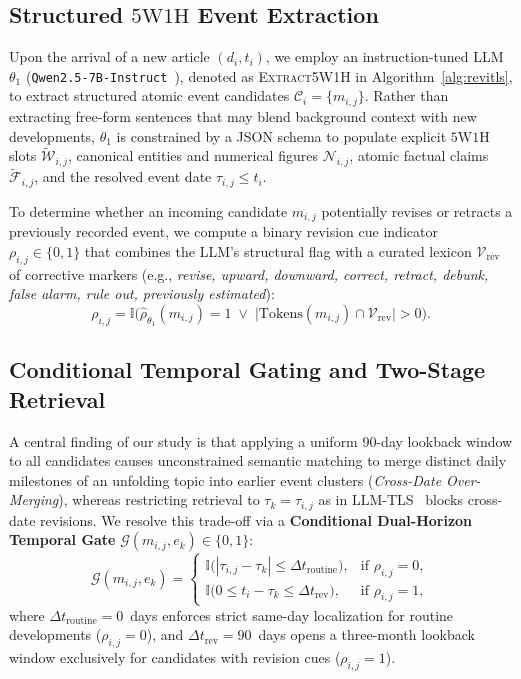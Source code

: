 \documentclass[journal]{IEEEtran}
\begin{document}
\subsection{Structured $5\text{W}1\text{H}$ Event Extraction}
\label{subsec:extraction}

Upon the arrival of a new article $(d_i, t_i)$, we employ an instruction-tuned LLM $\theta_1$ (\texttt{Qwen2.5-7B-Instruct}~\cite{qwen25}), denoted as \textsc{Extract5W1H} in Algorithm~\ref{alg:revitls}, to extract structured atomic event candidates $\mathcal{C}_i = \{m_{i,j}\}$. Rather than extracting free-form sentences that may blend background context with new developments, $\theta_1$ is constrained by a JSON schema to populate explicit $5\text{W}1\text{H}$ slots $\tilde{\mathcal{W}}_{i,j}$, canonical entities and numerical figures $\mathcal{N}_{i,j}$, atomic factual claims $\tilde{\mathcal{F}}_{i,j}$, and the resolved event date $\tau_{i,j} \le t_i$.

To determine whether an incoming candidate $m_{i,j}$ potentially revises or retracts a previously recorded event, we compute a binary revision cue indicator $\rho_{i,j} \in \{0, 1\}$ that combines the LLM's structural flag with a curated lexicon $\mathcal{V}_{\text{rev}}$ of corrective markers (e.g., \textit{revise, upward, downward, correct, retract, debunk, false alarm, rule out, previously estimated}):
\begin{equation}
\rho_{i,j} = \mathbb{I}\Big( \hat{\rho}_{\theta_1}(m_{i,j}) = 1 \;\lor\; \big|\text{Tokens}(m_{i,j}) \cap \mathcal{V}_{\text{rev}}\big| > 0 \Big).
\label{eq:rev_cue}
\end{equation}

\subsection{Conditional Temporal Gating and Two-Stage Retrieval}
\label{subsec:retrieval}

A central finding of our study is that applying a uniform 90-day lookback window to all candidates causes unconstrained semantic matching to merge distinct daily milestones of an unfolding topic into earlier event clusters (\textit{Cross-Date Over-Merging}), whereas restricting retrieval to $\tau_k = \tau_{i,j}$ as in LLM-TLS~\cite{hu2024moments} blocks cross-date revisions. We resolve this trade-off via a \textbf{Conditional Dual-Horizon Temporal Gate} $\mathcal{G}(m_{i,j}, e_k) \in \{0, 1\}$:
\begin{equation}
\mathcal{G}(m_{i,j}, e_k) = \begin{cases}
\mathbb{I}\big( |\tau_{i,j} - \tau_k| \le \Delta t_{\text{routine}} \big), & \text{if } \rho_{i,j} = 0, \\[3pt]
\mathbb{I}\big( 0 \le t_i - \tau_k \le \Delta t_{\text{rev}} \big), & \text{if } \rho_{i,j} = 1,
\end{cases}
\label{eq:temporal_gate}
\end{equation}
where $\Delta t_{\text{routine}} = 0$~days enforces strict same-day localization for routine developments ($\rho_{i,j} = 0$), and $\Delta t_{\text{rev}} = 90$~days opens a three-month lookback window exclusively for candidates with revision cues ($\rho_{i,j} = 1$).
\end{document}
